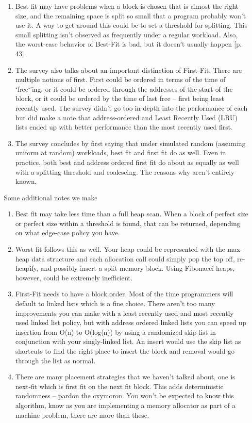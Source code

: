 \begin{enumerate}
\item Best fit may have problems when a block is chosen that is almost the right size, and the remaining space is split so small that a program probably won't use it.
  A way to get around this could be to set a threshold for splitting.
  This small splitting isn't observed as frequently under a regular workload.
  Also, the worst-case behavior of Best-Fit is bad, but it doesn't usually happen [p. 43].
\item The survey also talks about an important distinction of First-Fit.
  There are multiple notions of first.
  First could be ordered in terms of the time of `free`'ing, or it could be ordered through the addresses of the start of the block, or it could be ordered by the time of last free -- first being least recently used.
  The survey didn't go too in-depth into the performance of each but did make a note that address-ordered and Least Recently Used (LRU) lists ended up with better performance than the most recently used first.
\item The survey concludes by first saying that under simulated random (assuming uniform at random) workloads, best fit and first fit do as well. Even in practice, both best and address ordered first fit do about as equally as well with a splitting threshold and coalescing. The reasons why aren't entirely known.
\end{enumerate}

Some additional notes we make

\begin{enumerate}
\item Best fit may take less time than a full heap scan. When a block of perfect size or perfect size within a threshold is found, that can be returned, depending on what edge-case policy you have.
\item Worst fit follows this as well. Your heap could be represented with the max-heap data structure and each allocation call could simply pop the top off, re-heapify, and possibly insert a split memory block.
  Using Fibonacci heaps, however, could be extremely inefficient.
\item First-Fit needs to have a block order. Most of the time programmers will default to linked lists which is a fine choice. There aren't too many improvements you can make with a least recently used and most recently used linked list policy, but with address ordered linked lists you can speed up insertion from O(n) to O(log(n)) by using a randomized skip-list in conjunction with your singly-linked list.
  An insert would use the skip list as shortcuts to find the right place to insert the block and removal would go through the list as normal.
\item There are many placement strategies that we haven't talked about, one is next-fit which is first fit on the next fit block. This adds deterministic randomness -- pardon the oxymoron. You won't be expected to know this algorithm, know as you are implementing a memory allocator as part of a machine problem, there are more than these.
  \end{enumerate}

